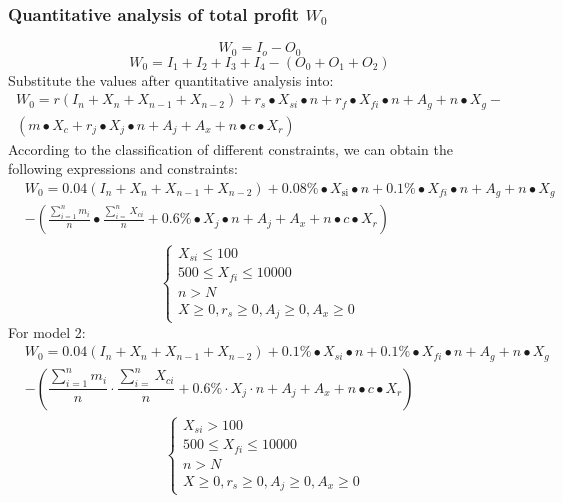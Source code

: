 \documentclass[../mcmpaper]{subfiles}
\begin{document}
\subsubsection{Quantitative analysis of total profit $W_0$}
\begin{equation}
W_0=I_o - O_0
\end{equation}
\begin{equation}
W_0=I_1+I_{2}+I_3+I_4-(O_0+O_1+O_2)
\end{equation}
Substitute the values after quantitative analysis into:
\begin{equation}
\begin{gathered}
W_{0}=r\left(I_{n}+X_{n}+X_{n-1}+X_{n-2}\right)+r_{s} \bullet X_{s i} \bullet n+r_{f} \bullet X_{f i} \bullet n+A_{g}+n \bullet X_{g}- \\
\left(m \bullet X_{c}+r_{j} \bullet X_{j} \bullet n+A_{j}+A_{x}+n \bullet c \bullet X_{r}\right)
\end{gathered}
\end{equation}
According to the classification of different constraints, we can obtain the following expressions and constraints:
\begin{equation}
\begin{aligned}
&W_{0}=0.04\left(I_{n}+X_{n}+X_{n-1}+X_{n-2}\right)+0.08 \% \bullet X_{\mathrm{si}} \bullet n+0.1 \% \bullet X_{f i} \bullet n+A_{g}+n \bullet X_{g} \\
&-\left(\frac{\sum_{i=1}^{n} m_{i}}{n} \bullet \frac{\sum_{i=}^{n} X_{c i}}{n}+0.6 \% \bullet X_{j} \bullet n+A_{j}+A_{x}+n \bullet c \bullet X_{r}\right)\\
\end{aligned}
\end{equation}
\begin{equation}
\left\{\begin{array}{l}
X_{s i} \leq 100 \\
500 \leq X_{f i} \leq 10000 \\
n>N \\
X \geq 0, r_{s} \geq 0, A_{j} \geq 0, A_{x} \geq 0
\end{array}\right.
\end{equation}
For model 2:
\begin{equation}
\begin{aligned}
&W_{0}=0.04\left(I_{n}+X_{n}+X_{n-1}+X_{n-2}\right)+0.1 \% \bullet X_{s i} \bullet n+0.1 \% \bullet X_{f i} \bullet n+A_{g}+n \bullet X_{g} \\
&-\left(\dfrac{\sum_{i=1}^{n} m_{i}}{n} \cdot \dfrac{\sum_{i=}^{n} X_{c i}}{n}+0.6 \% \cdot X_{j} \cdot n+A_{j}+A_{x}+n \bullet c \bullet X_{r}\right) \\
&\hspace{10em}\left\{\begin{array}{l}
X_{s i}>100 \\
500 \leq X_{f i} \leq 10000 \\
n>N \\
X \geq 0, r_{s} \geq 0, A_{j} \geq 0, A_{x} \geq 0
\end{array}\right.
\end{aligned}
\end{equation}
\end{document}
